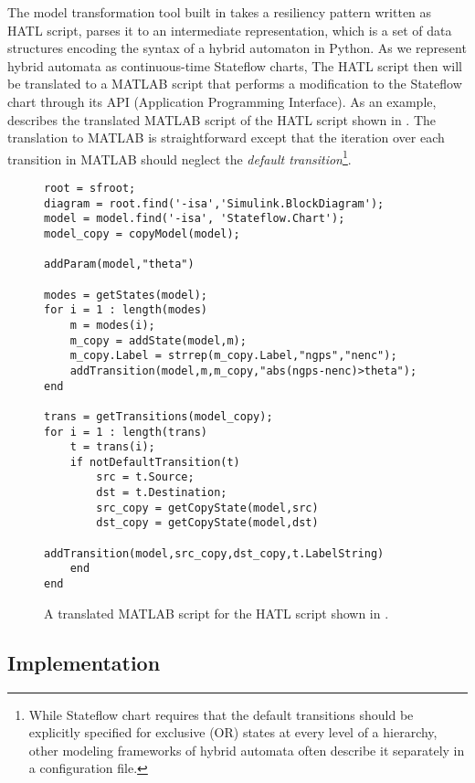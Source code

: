 The model transformation tool built in \toolreaffirm takes a resiliency pattern written as HATL script, parses it to an intermediate representation, which is a set of data structures encoding the syntax of a hybrid automaton in Python. As we represent hybrid automata as continuous-time Stateflow charts,
%
The HATL script then will be translated to a MATLAB script that performs a modification to the Stateflow chart through its API (Application Programming Interface). As an example,  describes the translated MATLAB script of the HATL script shown in . The translation to MATLAB is straightforward except that the iteration over each transition in MATLAB should neglect the \emph{default transition}\footnote{While Stateflow chart requires that the default transitions should be explicitly specified for exclusive (OR) states at every level of a hierarchy, other modeling frameworks of hybrid automata often describe it separately in a configuration file.}.  
%
\begin{figure}[!t]%
\begin{lstlisting}[basicstyle=\ttfamily\footnotesize, numbers=none]
root = sfroot;
diagram = root.find('-isa','Simulink.BlockDiagram');
model = model.find('-isa', 'Stateflow.Chart');
model_copy = copyModel(model);

addParam(model,"theta")

modes = getStates(model);
for i = 1 : length(modes)
	m = modes(i);
	m_copy = addState(model,m);
	m_copy.Label = strrep(m_copy.Label,"ngps","nenc");
	addTransition(model,m,m_copy,"abs(ngps-nenc)>theta");
end

trans = getTransitions(model_copy);
for i = 1 : length(trans)
	t = trans(i);
	if notDefaultTransition(t)
		src = t.Source;
		dst = t.Destination;
		src_copy = getCopyState(model,src)
		dst_copy = getCopyState(model,dst)
		addTransition(model,src_copy,dst_copy,t.LabelString)
	end
end
\end{lstlisting}
\caption{A translated MATLAB script for the HATL script shown in .}%
%
\end{figure}
%
\subsection{Implementation}